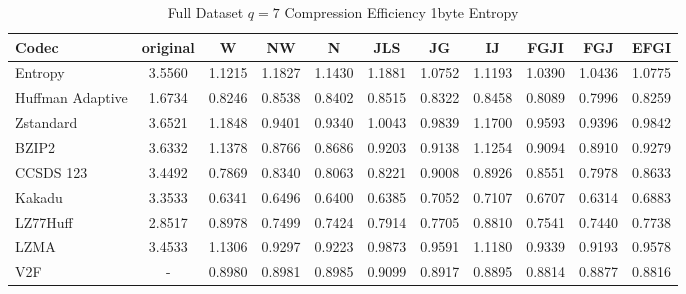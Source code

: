 \documentclass{article}
\begin{document}
\begin{table}[h!]
\centering
\caption{Full Dataset $q=7$ Compression Efficiency 1byte Entropy}
\begin{tabular}{|l|cccccccccc|}
\hline
Codec &  original &      W &     NW &      N &    JLS &     JG &     IJ &   FGJI &    FGJ &   EFGI \\
\hline
Entropy & 3.5560 & 1.1215 & 1.1827 & 1.1430 & 1.1881 & 1.0752 & 1.1193 & 1.0390 & 1.0436 & 1.0775 \\
\hline
Huffman Adaptive &    1.6734 & 0.8246 & 0.8538 & 0.8402 & 0.8515 & 0.8322 & 0.8458 & 0.8089 & 0.7996 & 0.8259 \\
Zstandard        &    3.6521 & 1.1848 & 0.9401 & 0.9340 & 1.0043 & 0.9839 & 1.1700 & 0.9593 & 0.9396 & 0.9842 \\
BZIP2            &    3.6332 & 1.1378 & 0.8766 & 0.8686 & 0.9203 & 0.9138 & 1.1254 & 0.9094 & 0.8910 & 0.9279 \\
CCSDS 123        &    3.4492 & 0.7869 & 0.8340 & 0.8063 & 0.8221 & 0.9008 & 0.8926 & 0.8551 & 0.7978 & 0.8633 \\
Kakadu           &    3.3533 & 0.6341 & 0.6496 & 0.6400 & 0.6385 & 0.7052 & 0.7107 & 0.6707 & 0.6314 & 0.6883 \\
LZ77Huff         &    2.8517 & 0.8978 & 0.7499 & 0.7424 & 0.7914 & 0.7705 & 0.8810 & 0.7541 & 0.7440 & 0.7738 \\
LZMA             &    3.4533 & 1.1306 & 0.9297 & 0.9223 & 0.9873 & 0.9591 & 1.1180 & 0.9339 & 0.9193 & 0.9578 \\
V2F              &    - & 0.8980 & 0.8981 & 0.8985 & 0.9099 & 0.8917 & 0.8895 & 0.8814 & 0.8877 & 0.8816 \\
\hline
\end{tabular}
\end{table}
\end{document}
